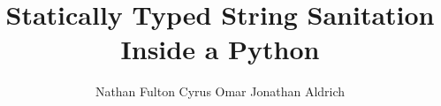 \documentclass[9pt]{sig-alternate}
\theoremstyle{definition}
\begin{document}


\newcommand{\Ace}{\textsf{Ace}}

\title{Statically Typed String Sanitation Inside a Python}
\author{
  \alignauthor
  Nathan Fulton
  \alignauthor
  Cyrus Omar
  \alignauthor
  Jonathan Aldrich
  \and
  \\
  \\
}
\end{document}
